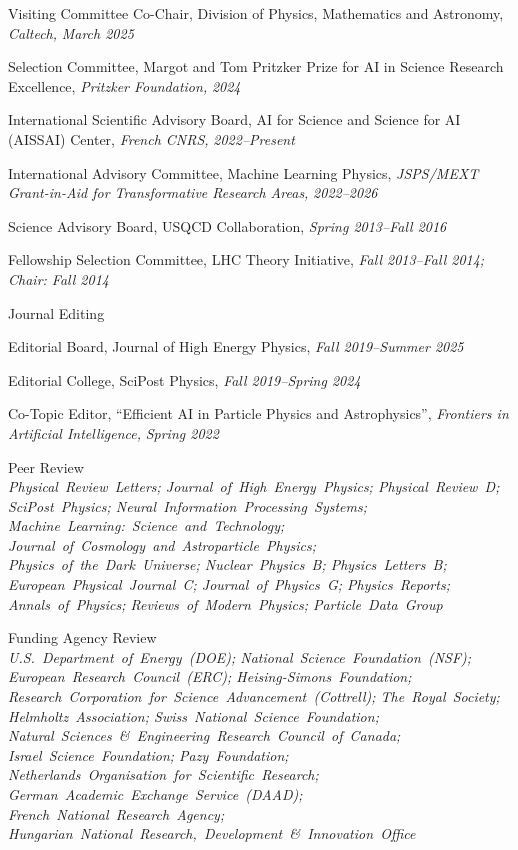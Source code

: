 \bsbl 
\item Visiting Committee Co-Chair, Division of Physics, Mathematics and Astronomy, \emph{Caltech, }\emph{March 2025}
\item Selection Committee, Margot and Tom Pritzker Prize for AI in Science Research Excellence, \emph{Pritzker Foundation, }\emph{2024}
\item International Scientific Advisory Board, AI for Science and Science for AI (AISSAI) Center, \emph{French CNRS, }\emph{2022--Present}
\item International Advisory Committee, Machine Learning Physics, \emph{JSPS/MEXT Grant-in-Aid for Transformative Research Areas, }\emph{2022--2026}
\item Science Advisory Board, USQCD Collaboration, \emph{Spring 2013--Fall 2016}
\item Fellowship Selection Committee, LHC Theory Initiative, \emph{Fall 2013--Fall 2014; Chair: Fall 2014}
\el 
\item Journal Editing
\bsbl 
\item Editorial Board, Journal of High Energy Physics, \emph{Fall 2019--Summer 2025}
\item Editorial College, SciPost Physics, \emph{Fall 2019--Spring 2024}
\item Co-Topic Editor, ``Efficient AI in Particle Physics and Astrophysics'', \emph{Frontiers in Artificial Intelligence, }\emph{Spring 2022}
\el 
\item \raggedright Peer Review \\ \textit{\nohyphens{Physical~Review~Letters; Journal~of~High~Energy~Physics; Physical~Review~D; SciPost~Physics; Neural~Information~Processing~Systems; Machine~Learning:~Science~and~Technology; Journal~of~Cosmology~and~Astroparticle~Physics; Physics~of~the~Dark~Universe; Nuclear~Physics~B; Physics~Letters~B; European~Physical~Journal~C; Journal~of~Physics~G; Physics~Reports; Annals~of~Physics; Reviews~of~Modern~Physics; Particle~Data~Group}}
\item \raggedright Funding Agency Review \\ \textit{\nohyphens{U.S.~Department~of~Energy~(DOE); National~Science~Foundation~(NSF); European~Research~Council~(ERC); Heising-Simons~Foundation; Research~Corporation~for~Science~Advancement~(Cottrell); The~Royal~Society; Helmholtz~Association; Swiss~National~Science~Foundation; Natural~Sciences~\&~Engineering~Research~Council~of~Canada; Israel~Science~Foundation; Pazy~Foundation; Netherlands~Organisation~for~Scientific~Research; German~Academic~Exchange~Service~(DAAD); French~National~Research~Agency; Hungarian~National~Research,~Development~\&~Innovation~Office}}
